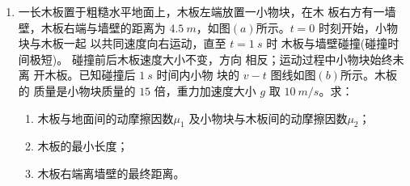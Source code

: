 \begin{enumerate}
{\begin{enumerate}
\end{enumerate}


}



\newpage
\item 
{}
一长木板置于粗糙水平地面上，木板左端放置一小物块，在木
板右方有一墙壁，木板右端与墙壁的距离为 $ 4.5 \ m $，如图$ (a) $所示。$ t=0 $ 时刻开始，小物块与木板一起
以共同速度向右运动，直至 $ t=1 \ s $ 时
木板与墙壁碰撞(碰撞时间极短)。
碰撞前后木板速度大小不变，方向
相反；运动过程中小物块始终未离
开木板。已知碰撞后 $ 1 \ s $ 时间内小物
块的 $ v-t $ 图线如图$ (b) $所示。木板的
质量是小物块质量的 $ 15 $ 倍，重力加速度大小 $ g $ 取 $ 10 \ m/s $。求：
\begin{enumerate}
\renewcommand{\labelenumi}{\arabic{enumi}.}
\item
木板与地面间的动摩擦因数$ \mu _{1} $ 及小物块与木板间的动摩擦因数$ \mu _{2} $；



\item 
木板的最小长度；



\item 
木板右端离墙壁的最终距离。



\end{enumerate}
\begin{figure}[h!]
\flushright

\end{figure}

\end{enumerate}
